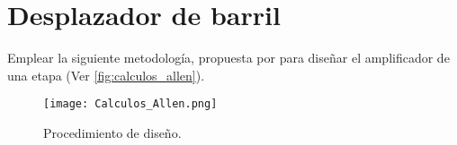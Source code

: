 \section{Desplazador de barril \label{sec:s1}}

\begin{center}
	\begin{minipage}{12cm}
		\begin{tcolorbox}[title=Actividad 1]
			Emplear la siguiente metodología, propuesta por \cite{Allen_2012} para diseñar el amplificador de una etapa (Ver \autoref{fig:calculos_allen}).
		\end{tcolorbox}	
	\end{minipage}
\end{center}

\begin{figure}[ht]
	\centering
	\texttt{[image: Calculos\_Allen.png]}
	\caption{Procedimiento de diseño. \label{fig:calculos_allen}}
\end{figure}

